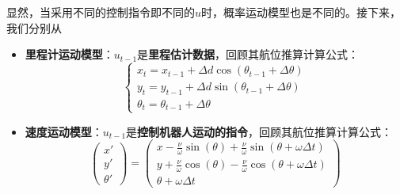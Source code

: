 \documentclass[../main.tex]{subfiles}
\begin{document}
        显然，当采用不同的控制指令即不同的$u$时，概率运动模型也是不同的。接下来，我们分别从
        \begin{itemize}
            \item \textbf{里程计运动模型}：$u_{t-1}$是\textbf{里程估计数据}，回顾其航位推算计算公式：
            $$\begin{cases}x_t=x_{t-1}+\Delta d\cos(\theta_{t-1}+\Delta\theta)\\y_t=y_{t-1}+\Delta d\sin(\theta_{t-1}+\Delta\theta)\\\theta_t=\theta_{t-1}+\Delta\theta\end{cases}$$
            \item \textbf{速度运动模型}：$u_{t-1}$是\textbf{控制机器人运动的指令}，回顾其航位推算计算公式：
            $$\left.\left(\begin{array}{c}x'\\y'\\\theta'\end{array}\right.\right)=\left(\begin{array}{c}x-\frac{\nu}{\omega}\sin(\theta)+\frac{\nu}{\omega}\sin(\theta+\omega\Delta t)\\y+\frac{\nu}{\omega}\cos(\theta)-\frac{\nu}{\omega}\cos(\theta+\omega\Delta t)\\\theta+\omega\Delta t\end{array}\right)$$
        \end{itemize}
\end{document}
